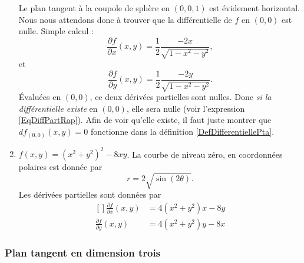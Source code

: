 \begin{example}
\begin{enumerate}
		      Le plan tangent à la coupole de sphère en $(0,0,1)$ est évidement horizontal. Nous nous attendons donc à trouver que la différentielle de $f$ en $(0,0)$ est nulle. Simple calcul :
		      \begin{equation}
			      \frac{ \partial f }{ \partial x }(x,y)=\frac{ 1 }{2}\frac{ -2x }{ \sqrt{1-x^2-y^2} },
		      \end{equation}
		      et
		      \begin{equation}
			      \frac{ \partial f }{ \partial y }(x,y)=\frac{ 1 }{2}\frac{ -2y }{ \sqrt{1-x^2-y^2} }.
		      \end{equation}
		      Évaluées en $(0,0)$, ce deux dérivées partielles sont nulles. Donc \emph{si la différentielle existe} en $(0,0)$, elle sera nulle (voir l'expression \eqref{EqDiffPartRap}). Afin de voir qu'elle existe, il faut juste montrer que $df_{(0,0)}(x,y)=0$ fonctionne dans la définition \ref{DefDifferentiellePta}.

		\item
		      $f(x,y)=(x^2+y^2)^2-8xy$. La courbe de niveau zéro, en coordonnées polaires est donnée par
		      \begin{equation}
			      r=2\sqrt{\sin(2\theta)}.
		      \end{equation}
		      Les dérivées partielles sont données par
		      \begin{equation}
			      \begin{aligned}[]
				      \frac{ \partial f }{ \partial x }(x,y) & =4(x^2+y^2)x-8y \\
				      \frac{ \partial f }{ \partial y }(x,y) & =4(x^2+y^2)y-8x
			      \end{aligned}
		      \end{equation}

	\end{enumerate}
\end{example}

\subsubsection{Plan tangent en dimension trois}

